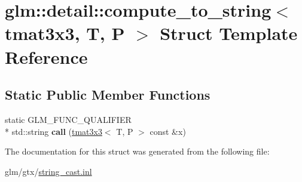 \hypertarget{structglm_1_1detail_1_1compute__to__string_3_01tmat3x3_00_01T_00_01P_01_4}{\section{glm\-:\-:detail\-:\-:compute\-\_\-to\-\_\-string$<$ tmat3x3, T, P $>$ Struct Template Reference}
\label{structglm_1_1detail_1_1compute__to__string_3_01tmat3x3_00_01T_00_01P_01_4}
}
\subsection*{Static Public Member Functions}
\begin{DoxyCompactItemize}
\item 
\hypertarget{structglm_1_1detail_1_1compute__to__string_3_01tmat3x3_00_01T_00_01P_01_4_a30955bc053389846e9f0a7a7154babb7}{static G\-L\-M\-\_\-\-F\-U\-N\-C\-\_\-\-Q\-U\-A\-L\-I\-F\-I\-E\-R \\*
std\-::string {\bfseries call} (\hyperlink{structglm_1_1tmat3x3}{tmat3x3}$<$ T, P $>$ const \&x)}\label{structglm_1_1detail_1_1compute__to__string_3_01tmat3x3_00_01T_00_01P_01_4_a30955bc053389846e9f0a7a7154babb7}

\end{DoxyCompactItemize}


The documentation for this struct was generated from the following file\-:\begin{DoxyCompactItemize}
\item 
glm/gtx/\hyperlink{string__cast_8inl}{string\-\_\-cast.\-inl}\end{DoxyCompactItemize}
